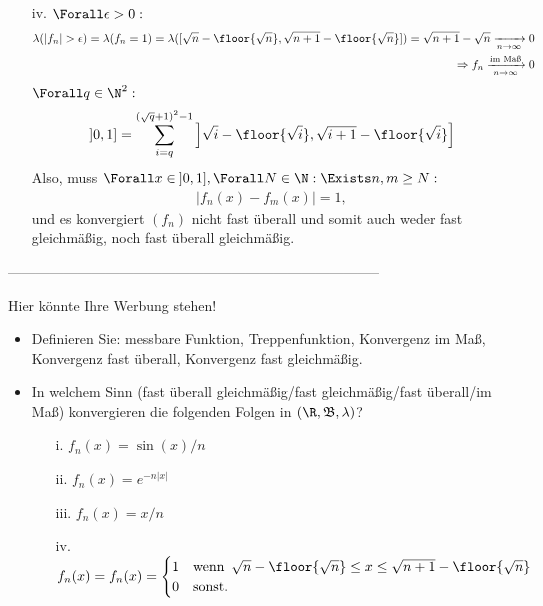 \begin{solution}
\begin{itemize}
  \item[iv.] $\Forall \epsilon > 0:$
  \begin{align*}
    \lambda(|f_n| > \epsilon)
    =
    \lambda(f_n = 1)
    =
    \lambda
    ([\sqrt{n} - \floor{\sqrt{n}}, \sqrt{n+1} - \floor{\sqrt{n}}])
    =
    \sqrt{n+1} - \sqrt{n}
    \xrightarrow[n \to \infty]{} 0 \\
    \Rightarrow
    f_n \xrightarrow[n \to \infty]{\text{im Maß}} 0
  \end{align*}
  $\Forall q \in \N^2:$
  \begin{align*}
    ]0, 1]
    =
    \sum_{i = q}^{(\sqrt{q}+1)^2-1}
    \left ]
    \sqrt{i} - \floor{\sqrt{i}}, \sqrt{i+1} - \floor{\sqrt{i}}
    \right ]
  \end{align*}
  Also, muss $\Forall x \in \: ]0, 1], \Forall N \in \N: \Exists n, m \geq N:$
  \begin{align*}
    |f_n(x) - f_m(x)| = 1,
  \end{align*}
  und es konvergiert $(f_n)$ nicht fast überall und somit auch weder fast gleichmäßig, noch fast überall gleichmäßig.

\end{itemize}

\end{solution}

--------------------------------------------------------------------------------

\begin{exercise}

Hier könnte Ihre Werbung stehen!

\begin{itemize}
  \item Definieren Sie: messbare Funktion, Treppenfunktion, Konvergenz im Maß, Konvergenz fast überall, Konvergenz fast gleichmäßig.
  \item In welchem Sinn (fast überall gleichmäßig/fast gleichmäßig/fast überall/im Maß) konvergieren die folgenden Folgen in $(\R, \mathfrak{B}, \lambda)$?
  \begin{itemize}
    \item[i.] $f_n(x) = \sin(x)/n$
    \item[ii.] $f_n(x) = e^{-n |x|}$
    \item[iii.] $f_n(x) = x/n$
    \item[iv.] $f_n(x) = f_n(x) =
    \begin{cases}
      1 & \text{wenn} \enspace \sqrt{n} - \floor{\sqrt{n}} \leq x \leq \sqrt{n+1} - \floor{\sqrt{n}} \\
      0 & \text{sonst}.
    \end{cases}$
  \end{itemize}
\end{itemize}

\end{exercise}

